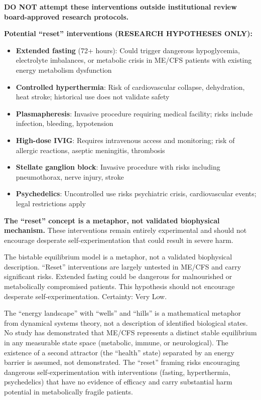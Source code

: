 \begin{speculation}
\begin{warning}
\textbf{DO NOT attempt these interventions outside institutional review board-approved research protocols.}
\end{warning}

\textbf{Potential ``reset'' interventions (RESEARCH HYPOTHESES ONLY):}
\begin{itemize}
    \item \textbf{Extended fasting} (72+ hours): Could trigger dangerous hypoglycemia, electrolyte imbalances, or metabolic crisis in ME/CFS patients with existing energy metabolism dysfunction
    \item \textbf{Controlled hyperthermia}: Risk of cardiovascular collapse, dehydration, heat stroke; historical use does not validate safety
    \item \textbf{Plasmapheresis}: Invasive procedure requiring medical facility; risks include infection, bleeding, hypotension
    \item \textbf{High-dose IVIG}: Requires intravenous access and monitoring; risk of allergic reactions, aseptic meningitis, thrombosis
    \item \textbf{Stellate ganglion block}: Invasive procedure with risks including pneumothorax, nerve injury, stroke
    \item \textbf{Psychedelics}: Uncontrolled use risks psychiatric crisis, cardiovascular events; legal restrictions apply
\end{itemize}

\textbf{The ``reset'' concept is a metaphor, not validated biophysical mechanism.} These interventions remain entirely experimental and should not encourage desperate self-experimentation that could result in severe harm.
\end{speculation}

\begin{warning}
The bistable equilibrium model is a metaphor, not a validated biophysical description. ``Reset'' interventions are largely untested in ME/CFS and carry significant risks. Extended fasting could be dangerous for malnourished or metabolically compromised patients. This hypothesis should not encourage desperate self-experimentation. Certainty: Very Low.
\end{warning}

\begin{limitation}
The ``energy landscape'' with ``wells'' and ``hills'' is a mathematical metaphor from dynamical systems theory, not a description of identified biological states. No study has demonstrated that ME/CFS represents a distinct stable equilibrium in any measurable state space (metabolic, immune, or neurological). The existence of a second attractor (the ``health'' state) separated by an energy barrier is assumed, not demonstrated. The ``reset'' framing risks encouraging dangerous self-experimentation with interventions (fasting, hyperthermia, psychedelics) that have no evidence of efficacy and carry substantial harm potential in metabolically fragile patients.
\end{limitation}

